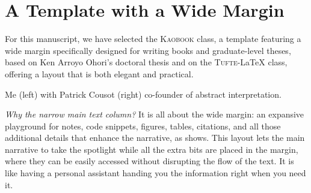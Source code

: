 \def\customcitkey{Urban2018}\def\absintkey{Cousot1977}


\chapter*{A Template with a Wide Margin}

For this manuscript, we have selected the \textsc{Kaobook} class, a template featuring a wide margin specifically designed for writing books and graduate-level theses, based on Ken Arroyo Ohori's doctoral thesis and on the \textsc{Tufte}-\LaTeX{} class, offering a layout that is both elegant and practical.

\marginnote{\formatmargincitation{\absintkey}}
\newcommand*{\ClipSep}{0.5cm}
\begin{marginfigure}
  \centering
  \hspace*{-\ClipSep}
    \vspace*{-\ClipSep}
  \caption{Me (left) with Patrick Cousot (right) co-founder of abstract interpretation\cite{\absintkey}.}
\end{marginfigure}

\emph{Why the narrow main text column?} It is all about the wide margin: an expansive playground for notes, code snippets, figures, tables, citations, and all those additional details that enhance the narrative, as  shows.
This layout lets the main narrative to take the spotlight while all the extra bits are placed in the margin, where they can be easily accessed without disrupting the flow of the text. It is like having a personal assistant handing you the information right when you need it.

